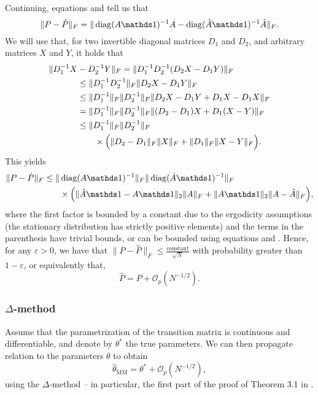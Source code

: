 \documentclass[journal]{IEEEtran}
\begin{document}
Continuing, equations  and  tell us that
\begin{equation}
    \|P - \hat P\|_F = \|\diag{A \ones}^{-1} A - \diag{\hat A \ones}^{-1} \hat A\|_F.
\end{equation}
We will use that, for two invertible diagonal matrices $D_1$ and $D_2$, and
arbitrary matrices $X$ and $Y$, it holds that
\begin{align}
    \|D_1^{-1}X &- D_2^{-1}Y\|_F = \|D_1^{-1}D_2^{-1} (D_2 X - D_1 Y) \|_F \notag \\
                                &\leq \|D_1^{-1} D_2^{-1}\|_F \| D_2 X - D_1 Y \|_F \notag \\
                                &\leq \|D_1^{-1}\|_F \|D_2^{-1}\|_F \| D_2 X - D_1 Y + D_1 X - D_1 X \|_F \notag \\
                                &= \|D_1^{-1}\|_F \|D_2^{-1}\|_F \| (D_2 - D_1) X + D_1 (X-Y) \|_F \notag \\
                                &\leq \|D_1^{-1}\|_F \|D_2^{-1}\|_F \notag \\
                                &\quad\quad \times \Big( \|
    D_2 - D_1\|_F \|X\|_F + \|D_1\|_F \|X-Y \|_F \Big). 
\end{align}
This yields
\begin{align}
    \|P - \hat P\|_F \leq \|&\diag{A \ones}^{-1}\|_F \|\diag{\hat A \ones}^{-1}\|_F \notag \\
    &\times \Big( \|\hat A \ones - A \ones\|_2 \|A\|_F + \|A\ones\|_2 \|A - \hat A\|_F \Big),
\end{align}
where the first factor is bounded
by a constant due to the ergodicity assumptions (the stationary distribution
has strictly positive elements) and the terms in the parenthesis have trivial
bounds, or can be bounded using equations  and
. Hence, for any
$\varepsilon > 0$, we have that $\|P - \hat P\|_F
\leq \frac{\text{constant}}{\sqrt{N}}$ with probability greater than
$1-\varepsilon$, or equivalently that,
\begin{equation}
    \hat P = P + \mathcal{O}_p(N^{-1/2}).
    \label{eq:Op_P}
\end{equation}

\subsubsection{$\Delta$-method}

Assume that the parametrization of the transition matrix is continuous and differentiable,
and denote by $\theta^*$ the true parameters. We can then propagate relation
 to the parameters $\theta$ to obtain
\begin{equation}
    \hat \theta_\text{MM} = \theta^* + \mathcal{O}_p(N^{-1/2}),
\end{equation}
using the $\Delta$-method -- in particular, the first part of the proof of Theorem 3.1 in
\cite{vaart_asymptotic_1998}.  
\end{document}
